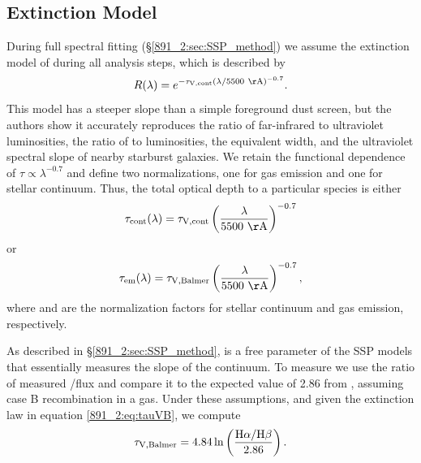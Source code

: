 
\subsection{Extinction Model}
\label{891_2:sec:extinction}

During full spectral fitting (\S\ref{891_2:sec:SSP_method}) we assume the
extinction model of \citet{Charlot00} during all analysis steps, which
is described by
\begin{equation}
R(\lambda) = e^{-\tauV \left(\lambda/\val{5500}{\AA}\right)^{-0.7}}.
\end{equation}
This model has a steeper slope than a simple foreground dust screen,
but the authors show it accurately reproduces the ratio of
far-infrared to ultraviolet luminosities, the ratio of \Ha to \HB
luminosities, the \Ha equivalent width, and the ultraviolet spectral
slope of nearby starburst galaxies. We retain the functional
dependence of $\tau \propto \lambda^{-0.7}$ and define two
normalizations, one for gas emission and one for stellar
continuum. Thus, the total optical depth to a particular species is
either
\begin{equation}
\tau_{{\rm cont}}(\lambda) = \tauV \left(\frac{\lambda}{\val{5500}{\AA}}\right)^{-0.7}
\end{equation}
or
\begin{equation}
\label{891_2:eq:tauVB}
\tau_{{\rm em}}(\lambda) = \tauVB \left(\frac{\lambda}{\val{5500}{\AA}}\right)^{-0.7},
\end{equation}
where \tauV and \tauVB are the normalization factors for stellar continuum and
gas emission, respectively.

As described in \S\ref{891_2:sec:SSP_method}, \tauV is a free parameter of
the SSP models that essentially measures the slope of the
continuum. To measure \tauVB we use the ratio of measured \Ha/\HB flux
and compare it to the expected value of 2.86 from
\citet{Osterbrock89}, assuming case B recombination in a 
gas. Under these assumptions, and given the extinction law in equation
\ref{891_2:eq:tauVB}, we compute
\begin{equation}
\label{891_2:eq:Balmer_extinction}
\tau_{\mathrm{V,Balmer}} = 4.84 \ln \left(\frac{\mathrm{H}\alpha/\mathrm{H}\beta}{2.86}\right).
\end{equation}

